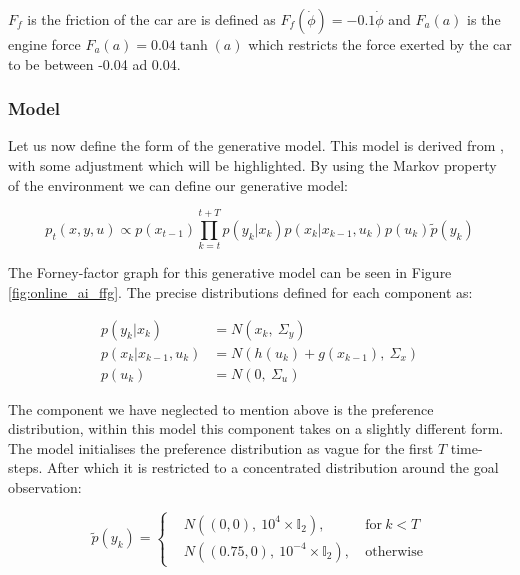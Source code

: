 \documentclass{article}
\begin{document}
$F_f$ is the friction of the car are is defined as $F_f(\dot{\phi}) = -0.1 \dot{\phi}$ and $F_a(a)$ is the engine force $F_a(a) = 0.04 \tanh(a)$ which restricts the force exerted by the car to be between -0.04 ad 0.04.

\subsubsection{Model}

Let us now define the form of the generative model. This model is derived from \citet{van2019simulating}, with some adjustment which will be highlighted. By using the Markov property of the environment we can define our generative model:

\begin{equation}\label{eq:mountain_car_generative_model}
	p_t(x, y, u) \propto p(x_{t-1}) \prod_{k=t}^{t + T} p(y_k | x_k) p(x_k | x_{k-1}, u_k)p(u_k)\tilde{p}(y_k)
\end{equation}

The Forney-factor graph for this generative model can be seen in Figure \ref{fig:online_ai_ffg}. The precise distributions defined for each component as:

\begin{equation}
\begin{aligned}
	p(y_k | x_k) &= N(x_k, \ \Sigma_y ) \\
	p(x_k | x_{k-1}, u_k) &= N(h(u_k) + g(x_{k-1}), \ \Sigma_x) \\
	p(u_k) &= N(0, \ \Sigma_u)
\end{aligned}	
\end{equation}

The component we have neglected to mention above is the preference distribution, within this model this component takes on a slightly different form. The model initialises the preference distribution as vague for the first $T$ time-steps. After which it is restricted to a concentrated distribution around the goal observation:


\begin{equation}
	\tilde{p}(y_k) = \left\{
	\begin{aligned}
		& N((0, 0), \ 10^{4} \times \mathbb{I}_2) , \ & \text{for} \ k < T \\
		& N((0.75, 0), \ 10^{-4} \times \mathbb{I}_2) , \ & \text{otherwise}
	\end{aligned}
	\right.
\end{equation}
\end{document}

